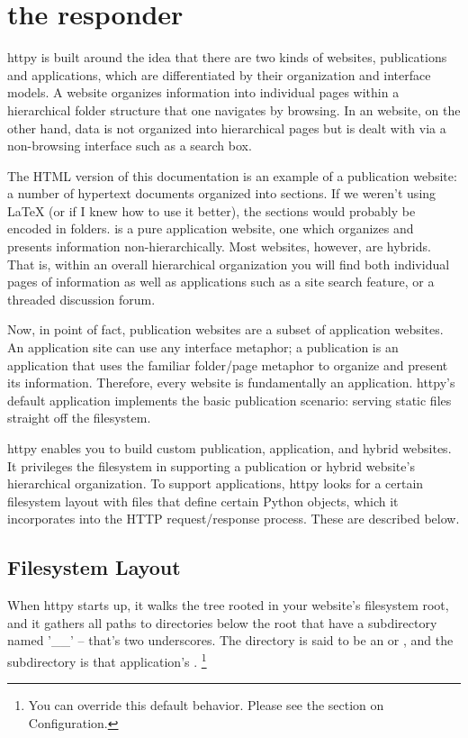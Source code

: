 \chapter{the  responder}

httpy is built around the idea that there are two kinds of websites,
publications and applications, which are differentiated by their organization
and interface models. A  website organizes information into
individual pages within a hierarchical folder structure that one navigates by
browsing. In an  website, on the other hand, data is not
organized into hierarchical pages but is dealt with via a non-browsing interface
such as a search box.

The HTML version of this documentation is an example of a publication website: a
number of hypertext documents organized into sections. If we weren't using LaTeX
(or if I knew how to use it better), the sections would probably be encoded in
folders.  is a pure application
website, one which organizes and presents information non-hierarchically. Most
websites, however, are hybrids. That is, within an overall hierarchical
organization you will find both individual pages of information as well as
applications such as a site search feature, or a threaded discussion forum.

Now, in point of fact, publication websites are a subset of application
websites. An application site can use any interface metaphor; a publication is
an application that uses the familiar folder/page metaphor to organize and
present its information. Therefore, every website is fundamentally an
application. httpy's default application implements the basic publication
scenario: serving static files straight off the filesystem.

httpy enables you to build custom publication, application, and hybrid websites.
It privileges the filesystem in supporting a publication or hybrid website's
hierarchical organization. To support applications, httpy looks for a certain
filesystem layout with files that define certain Python objects, which it
incorporates into the HTTP request/response process. These are described below.



\section{Filesystem Layout}

When httpy starts up, it walks the tree rooted in your website's filesystem
root, and it gathers all paths to directories below the root that have a
subdirectory named '__' -- that's two underscores. The directory is said to be
an  or , and the subdirectory is that application's
. \footnote{You can override this default behavior. Please
see the section on Configuration.}

